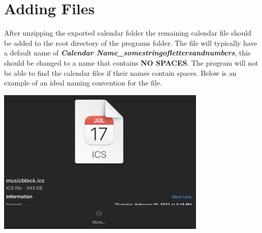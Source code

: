 \section*{Adding Files}
After unzipping the exported calendar folder the remaining calendar file should be added to the root directory of the programs folder. The file will typically have a default name of \textbf{\textit{Calendar Name\_somestringoflettersandnumbers}}, this should be changed to a name that contains \textbf{NO SPACES}. The program will not be able to find the calendar files if their names contain spaces. Below is an example of an ideal naming convention for the file.

\begin{center}
   \includegraphics[width=100mm]{images/file.png} 
\end{center}